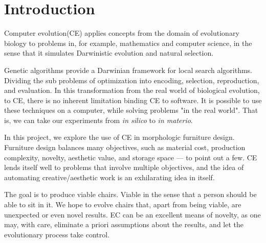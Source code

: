 \section{Introduction}
Computer evolution(CE) applies concepts from the domain of evolutionary
biology to problems in, for example, mathematics and computer science, in the
sense that it simulates Darwinistic evolution and natural selection.

Genetic algorithms provide a Darwinian framework for local search algorithms.
Dividing the sub problems of optimization into encoding, selection,
reproduction, and evaluation. In this transformation from the real world of
biological evolution, to CE, there is no inherent limitation binding CE to
software. It is possible to use these techniques on a computer, while solving
problems "in the real world". That is, we can take our experiments from
\emph{in silico} to \emph{in materio}\cite{paper:ev3}.

In this project, we explore the use of CE in morphologic furniture design.
Furniture design balances many objectives, such as material cost, production
complexity, novelty, aesthetic value, and storage space --- to point out a few.
CE lends itself well to problems that involve multiple objectives, and the idea
of automating creative/aesthetic work is an exhilarating idea in itself.

The goal is to produce viable chairs. Viable in the sense that a person should 
be able to sit in it. We hope to evolve chairs that, apart from being viable,
are unexpected or even novel results. EC can be an excellent means of novelty,
as one may, with care, eliminate a priori assumptions about the results, and let
the evolutionary process take control.

